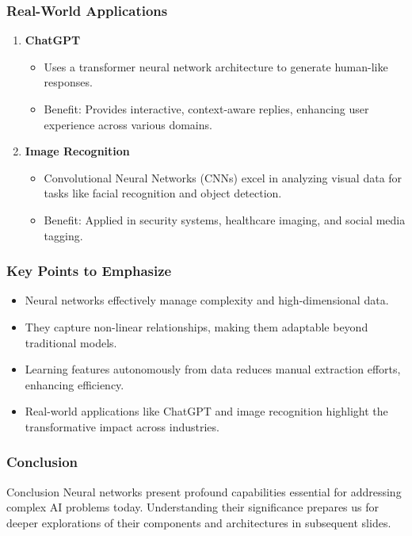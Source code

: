 \documentclass[aspectratio=169]{beamer}
\begin{document}
\begin{frame}[fragile]
    \frametitle{Real-World Applications}
    \begin{enumerate}
        \item \textbf{ChatGPT}
            \begin{itemize}
                \item Uses a transformer neural network architecture to generate human-like responses.
                \item Benefit: Provides interactive, context-aware replies, enhancing user experience across various domains.
            \end{itemize}

        \item \textbf{Image Recognition}
            \begin{itemize}
                \item Convolutional Neural Networks (CNNs) excel in analyzing visual data for tasks like facial recognition and object detection.
                \item Benefit: Applied in security systems, healthcare imaging, and social media tagging.
            \end{itemize}
    \end{enumerate}
\end{frame}

\begin{frame}[fragile]
    \frametitle{Key Points to Emphasize}
    \begin{itemize}
        \item Neural networks effectively manage complexity and high-dimensional data. 
        \item They capture non-linear relationships, making them adaptable beyond traditional models.
        \item Learning features autonomously from data reduces manual extraction efforts, enhancing efficiency.
        \item Real-world applications like ChatGPT and image recognition highlight the transformative impact across industries.
    \end{itemize}
\end{frame}

\begin{frame}[fragile]
    \frametitle{Conclusion}
    \begin{block}{Conclusion}
        Neural networks present profound capabilities essential for addressing complex AI problems today. Understanding their significance prepares us for deeper explorations of their components and architectures in subsequent slides.
    \end{block}
\end{frame}
\end{document}
